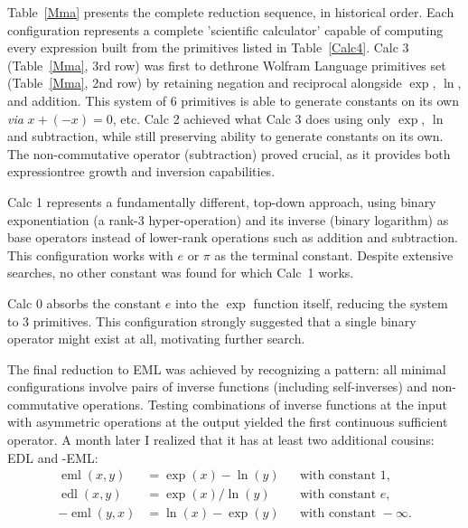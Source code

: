 \documentclass[12pt]{article}
\DeclareMathOperator{\eml}{eml}
\DeclareMathOperator{\edl}{edl}
\begin{document}
Table~\ref{Mma} presents the complete reduction sequence, in historical order. Each configuration represents a complete 'scientific calculator' capable of computing every expression built from the primitives listed in Table~\ref{Calc4}.
Calc 3 (Table~\ref{Mma}, 3rd row) was first to dethrone Wolfram Language primitives set (Table~\ref{Mma}, 2nd row) by retaining negation and reciprocal alongside $\exp$, $\ln$, and addition. This system of 6 primitives is able to generate constants on its own {\em via} $x + (-x) = 0$, etc. 
Calc 2 achieved what Calc 3 does using only $\exp$, $\ln$ and subtraction, while still preserving ability to generate constants on its own. The non-commutative operator (subtraction) proved crucial, as it provides both expression\text{-}tree growth and inversion capabilities.

Calc 1 represents a fundamentally different, top-down approach, using binary exponentiation (a rank-3 hyper-operation) and its inverse (binary logarithm) as base operators instead of lower-rank operations such as addition and subtraction. This configuration works with $e$ or $\pi$ as the terminal constant. Despite extensive searches, no other constant was found for which Calc~1 works.

Calc 0 absorbs the constant $e$ into the $\exp$ function itself, reducing the system to 3 primitives. This configuration strongly suggested that a single binary operator might exist at all, motivating further search.

The final reduction to EML was achieved by recognizing a pattern: all minimal configurations involve pairs of inverse functions (including self-inverses) and non-commutative operations. Testing combinations of inverse functions at the input with asymmetric operations at the output yielded the first continuous sufficient operator. A month later I realized that it has at least two additional cousins: EDL and -EML:
\begin{subequations}
\label{Sheffers}
\begin{align}
\label{eml-1}
\eml(x,y)  &= \exp(x) - \ln(y)  && \text{with constant } 1,\\
\label{edl-e}
\edl(x,y)  &= \exp(x)/\ln(y)    && \text{with constant } e,\\
\label{eml-infty}
-\eml(y,x) &= \ln(x) - \exp(y)  && \text{with constant } -\infty.
\end{align}
\end{subequations}
\end{document}
